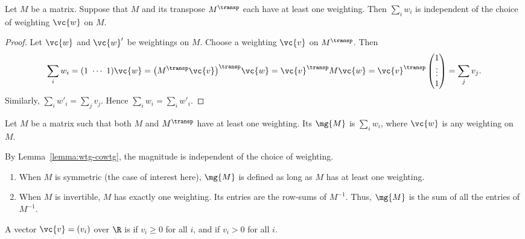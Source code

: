 \begin{lemma}
Let $M$ be a matrix.  Suppose that $M$ and its transpose $M^\transp$
each have at least one weighting.  Then $\sum_i w_i$ is independent of the
choice of weighting $\vc{w}$ on $M$.
\end{lemma}

\begin{proof}
Let $\vc{w}$ and $\vc{w}'$ be weightings on $M$.  Choose a weighting $\vc{v}$
on $M^\transp$.  Then
\[
\sum_i w_i 
= 
(1 \ \cdots\ 1) \vc{w}
=
\bigl(M^\transp \vc{v}\bigr)^\transp \vc{w} 
=
\vc{v}^\transp M \vc{w}
=
\vc{v}^\transp \begin{pmatrix} 1\\ \vdots\\ 1 \end{pmatrix}
=
\sum_j v_j.
\]
Similarly, $\sum_i w'_i = \sum_j v_j$.  Hence $\sum_i w_i = \sum_i w'_i$.
\end{proof}

\begin{defn}
% 
Let $M$ be a matrix such that both $M$ and $M^\transp$ have at least
one weighting.  Its %
% 
% 
$\mg{M}$ is $\sum_i w_i$, where $\vc{w}$ is any weighting on
$M$.
\end{defn}

By Lemma~\ref{lemma:wtg-cowtg}, the magnitude is independent of the choice
of weighting.  

\begin{remarks}
\begin{enumerate}
\item
{}
When $M$ is symmetric (the case of interest here), $\mg{M}$ is defined as
long as $M$ has at least one weighting.  

\item
{}
When $M$ is invertible, $M$ has exactly one weighting. Its entries are
the row-sums of $M^{-1}$.  Thus, $\mg{M}$ is the sum of all the entries of
$M^{-1}$.
\end{enumerate}
\end{remarks}

\begin{defn}
A vector $\vc{v} = (v_i)$ over $\R$ is
%
%
% 
% 
if $v_i \geq 0$ for all $i$, and %
%
%
% 
if $v_i > 0$ for all $i$.  
\end{defn}

